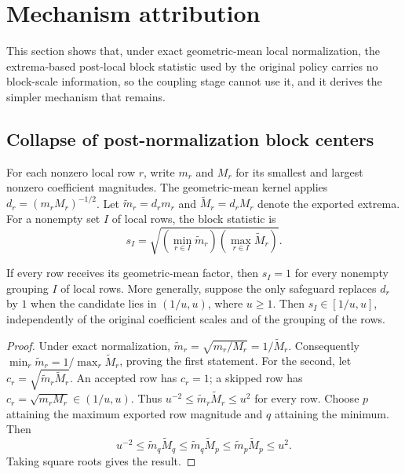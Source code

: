 \section{Mechanism attribution}
\label{sec:identifiability}

This section shows that, under exact geometric-mean local normalization, the extrema-based
post-local block statistic used by the original policy carries no block-scale information, so
the coupling stage cannot use it, and it derives the simpler mechanism that remains.

\subsection{Collapse of post-normalization block centers}

For each nonzero local row $r$, write $m_r$ and $M_r$ for its smallest and largest
nonzero coefficient magnitudes. The geometric-mean kernel applies
$d_r=(m_rM_r)^{-1/2}$. Let $\widetilde m_r=d_rm_r$ and $\widetilde M_r=d_rM_r$ denote the
exported extrema. For a nonempty set $I$ of local rows, the block statistic is
\[
 s_I=\sqrt{\left(\min_{r\in I}\widetilde m_r\right)
                 \left(\max_{r\in I}\widetilde M_r\right)}.
\]

\begin{proposition}
\label{prop:audit-collapse}
If every row receives its geometric-mean factor, then $s_I=1$ for every nonempty grouping
$I$ of local rows. More generally, suppose the only safeguard replaces $d_r$ by $1$ when the
candidate lies in $(1/u,u)$, where $u\geq1$. Then $s_I\in[1/u,u]$, independently of the
original coefficient scales and of the grouping of the rows.
\end{proposition}
\begin{proof}
Under exact normalization, $\widetilde m_r=\sqrt{m_r/M_r}=1/\widetilde M_r$. Consequently
$\min_r\widetilde m_r=1/\max_r\widetilde M_r$, proving the first statement.
For the second, let $c_r=\sqrt{\widetilde m_r\widetilde M_r}$. An accepted row has
$c_r=1$; a skipped row has $c_r=\sqrt{m_rM_r}\in(1/u,u)$. Thus
$u^{-2}\leq\widetilde m_r\widetilde M_r\leq u^2$ for every row. Choose $p$ attaining
the maximum exported row magnitude and $q$ attaining the minimum. Then
\[
 u^{-2}\leq\widetilde m_q\widetilde M_q
 \leq\widetilde m_q\widetilde M_p
 \leq\widetilde m_p\widetilde M_p\leq u^2.
\]
Taking square roots gives the result.
\end{proof}

